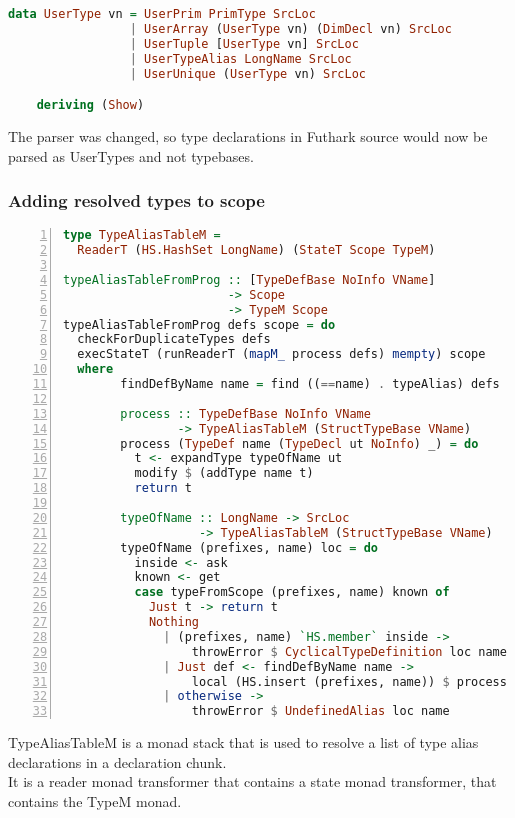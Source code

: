 \begin{lstlisting}[language=Haskell]
data UserType vn = UserPrim PrimType SrcLoc
                 | UserArray (UserType vn) (DimDecl vn) SrcLoc
                 | UserTuple [UserType vn] SrcLoc
                 | UserTypeAlias LongName SrcLoc
                 | UserUnique (UserType vn) SrcLoc

    deriving (Show)
\end{lstlisting}

The parser was changed, so type declarations in Futhark source would now be parsed as UserTypes and not
typebases.

\subsubsection{Adding resolved types to scope}\label{typealiasingcode}
\begin{lstlisting}[language=Haskell, numbers=left]
  type TypeAliasTableM =
  ReaderT (HS.HashSet LongName) (StateT Scope TypeM)

typeAliasTableFromProg :: [TypeDefBase NoInfo VName]
                       -> Scope
                       -> TypeM Scope
typeAliasTableFromProg defs scope = do
  checkForDuplicateTypes defs
  execStateT (runReaderT (mapM_ process defs) mempty) scope
  where
        findDefByName name = find ((==name) . typeAlias) defs

        process :: TypeDefBase NoInfo VName
                -> TypeAliasTableM (StructTypeBase VName)
        process (TypeDef name (TypeDecl ut NoInfo) _) = do
          t <- expandType typeOfName ut
          modify $ (addType name t)
          return t

        typeOfName :: LongName -> SrcLoc
                   -> TypeAliasTableM (StructTypeBase VName)
        typeOfName (prefixes, name) loc = do
          inside <- ask
          known <- get
          case typeFromScope (prefixes, name) known of
            Just t -> return t
            Nothing
              | (prefixes, name) `HS.member` inside ->
                  throwError $ CyclicalTypeDefinition loc name
              | Just def <- findDefByName name ->
                  local (HS.insert (prefixes, name)) $ process def
              | otherwise ->
                  throwError $ UndefinedAlias loc name
\end{lstlisting}

TypeAliasTableM is a monad stack that is used to resolve a list of type alias
declarations in a declaration chunk. \\
It is a reader monad transformer that contains a state monad transformer, that
contains the TypeM monad.

